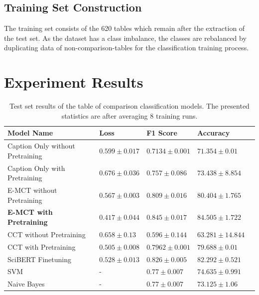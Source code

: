 \subsection{Training Set Construction}
The training set consists of the 620 tables which remain after the extraction of the test set. As the dataset has a class imbalance, the classes are rebalanced by duplicating data of non-comparison-tables for the classification training process. 
\pagebreak
\section{Experiment Results}
\label{table_classification:experiment-result}

\begin{table}[h]
    \label{table\arabic{tablecounter}}
    \centering
    \begin{tabular}{llllr}
        \toprule
                         Model Name &                 Loss &             F1 Score &               Accuracy \\
        \midrule
          Caption Only without Pretraining &  $ 0.599 \pm 0.017 $ &    $ 0.7134 \pm 0.001 $ &     $ 71.354 \pm 0.01 $ \\
          Caption Only with Pretraining  &  $ 0.676 \pm 0.036 $ &  $ 0.757 \pm 0.086 $ &   $ 73.438 \pm 8.854 $ \\
          E-MCT without Pretraining &  $ 0.567 \pm 0.003 $ &  $ 0.809 \pm 0.016 $ &   $ 80.404 \pm 1.765 $ \\
          \textbf{E-MCT with Pretraining} &  $ \mathbf{0.417 \pm 0.044} $ &  $ \mathbf{0.845 \pm 0.017}$ &  $\mathbf{84.505 \pm 1.722}$ \\
          CCT without Pretraining &   $ 0.658 \pm 0.13 $ &  $ 0.596 \pm 0.144 $ &  $ 63.281 \pm 14.844 $ \\
          CCT with Pretraining &  $ 0.505 \pm 0.008 $ &    $ 0.7962 \pm 0.001 $ &     $ 79.688 \pm 0.01 $ \\
          SciBERT Finetuning &  $ 0.528 \pm 0.013 $ &  $ 0.826 \pm 0.005 $ &   $ 82.292 \pm 0.521 $ \\
          SVM &  -  &  $ 0.77 \pm 0.007 $ &   $ 74.635 \pm 0.991 $ \\
          Naive Bayes &  -  &  $ 0.77 \pm 0.007 $ &   $ 73.125 \pm 1.06 $ \\
        \bottomrule
    \end{tabular}
    \caption{Test set results of the table of comparison classification models. The presented statistics are after averaging 8 training runs. }
\end{table}

